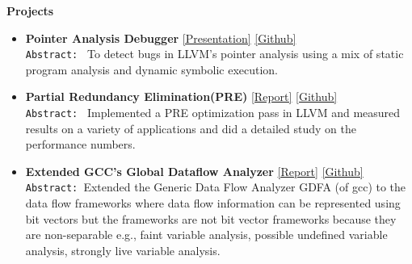 \documentclass[9pt]{article}
\newenvironment{changemargin}[2]{%
  \begin{list}{}{%
    \setlength{\topsep}{0pt}%
    \setlength{\leftmargin}{#1}%
    \setlength{\rightmargin}{#2}%
    \setlength{\listparindent}{\parindent}%
    \setlength{\itemindent}{\parindent}%
    \setlength{\parsep}{\parskip}%
  }%
  \item[]}{\end{list}
}
\newenvironment{body} {
	\vspace*{-16pt}
	\begin{changemargin}{-0.25in}{-0.5in}
  }	
	{\end{changemargin}
}
\begin{document}
\begin{body}
	\vspace{14pt}
	\textbf{Projects}{} \hfill  \\
	\begin{itemize} \itemsep 3pt

           \item \textbf{Pointer Analysis Debugger} 
             \href{https://www.dropbox.com/s/pm47zniafdydotw/pa_debugger.pdf?dl=0}{[Presentation]} 
           \href{https://github.com/sdasgup3/symbolic-analysis}{[Github]} \\
                                  \texttt{Abstract: } To detect bugs in LLVM's
                                  pointer analysis using a mix of static
                                  program analysis and dynamic symbolic
                                  execution. 

           \item \textbf{Partial Redundancy Elimination(PRE)} 
           \href{http://webhost.engr.illinois.edu/~sdasgup3/Document/report_cs526.pdf}{[Report]} 
           \href{https://github.com/sdasgup3/partial-redundancy-elimination}{[Github]} \\
                                  \texttt{Abstract: } Implemented a PRE
                                  optimization pass in LLVM and measured results
                                  on a variety of applications and did a detailed 
                                  study on the performance numbers. 

            \item \textbf{Extended GCC's Global Dataflow Analyzer} 
           \href{http://webhost.engr.illinois.edu/~sdasgup3/Document/report_gdfa.pdf}{[Report]} 
           \href{https://github.com/sdasgup3/non-separable-global-dataflow-framework}{[Github]} \\
                                \texttt{Abstract: }Extended the Generic Data Flow Analyzer
                                GDFA (of gcc) to the data flow frameworks where
                                data flow information can be represented using
                                bit vectors but the frameworks are not bit
                                vector frameworks because they are
                                non-separable e.g., faint variable analysis,
                                possible undefined variable analysis, strongly
                                live variable analysis.	


\end{itemize}
\end{body}
\end{document}
